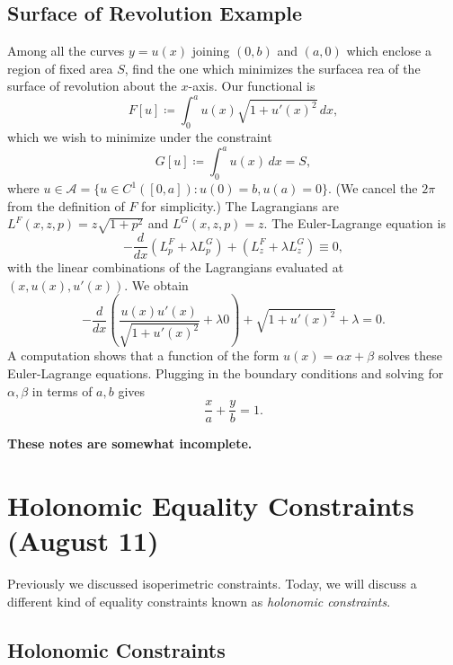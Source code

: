 \documentclass[11pt]{article}
\begin{document}
\subsection{Surface of Revolution Example}

Among all the curves $y = u(x)$ joining $(0, b)$ and $(a, 0)$ which enclose a region of fixed area $S$, find the one which minimizes the surfacea rea of the surface of revolution about the $x$-axis. Our functional is
\[
F[u] \coloneqq \int_0^a  u(x) \sqrt{1 + u'(x)^2} \, dx,
\]
which we wish to minimize under the constraint
\[
G[u] \coloneqq \int_0^a u(x) \, dx = S,
\]
where $u \in \mathcal{A} = \{ u \in C^1([0, a]) : u(0) = b, u(a) = 0 \}$. (We cancel the $2\pi$ from the definition of $F$ for simplicity.) The Lagrangians are $L^F(x,z,p) = z\sqrt{1 + p^2}$ and $L^G(x,z,p) = z$. The Euler-Lagrange equation is
\[
-\frac{d}{dx} (L^F_p + \lambda L^G_p) + (L^F_z + \lambda L^G_z) \equiv 0,
\]
with the linear combinations of the Lagrangians evaluated at $(x, u(x), u'(x))$. We obtain
\[
-\frac{d}{dx} \left( \frac{u(x)u'(x)}{\sqrt{1 + u'(x)^2}} + \lambda 0 \right) + \sqrt{1 + u'(x)^2} + \lambda = 0.
\]
A computation shows that a function of the form $u(x) = \alpha x + \beta$ solves these Euler-Lagrange equations. Plugging in the boundary conditions and solving for $\alpha, \beta$ in terms of $a, b$ gives
\[
\frac{x}{a} + \frac{y}{b} = 1.
\]

\textbf{These notes are somewhat incomplete.}

\newpage

\section{Holonomic Equality Constraints (August 11)}

Previously we discussed isoperimetric constraints. Today, we will discuss a different kind of equality constraints known as \emph{holonomic constraints}.

\subsection{Holonomic Constraints}
\end{document}
